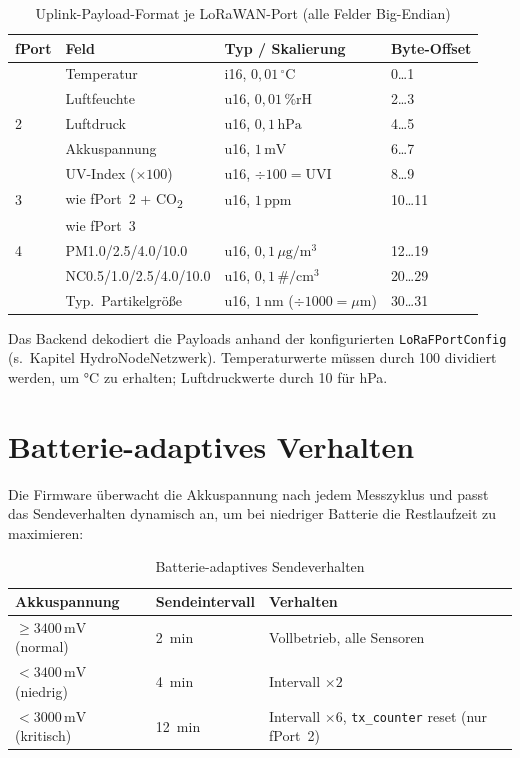 \begin{table}[H]
  \centering
  \begin{tabular}{llll}
    \hline
    \textbf{fPort} & \textbf{Feld} & \textbf{Typ / Skalierung} & \textbf{Byte-Offset} \\
    \hline
    \multirow{5}{*}{2}
      & Temperatur        & i16, $0{,}01\,{^\circ}$C & 0\dots1 \\
      & Luftfeuchte       & u16, $0{,}01\,\%\text{rH}$ & 2\dots3 \\
      & Luftdruck         & u16, $0{,}1\,\text{hPa}$    & 4\dots5 \\
      & Akkuspannung      & u16, $1\,\text{mV}$           & 6\dots7 \\
      & UV-Index ($\times 100$)   & u16, $\div 100 = \text{UVI}$     & 8\dots9 \\
    \hline
    3 & wie fPort~2 + CO\textsubscript{2} & u16, $1\,\text{ppm}$ & 10\dots11 \\
    \hline
    \multirow{3}{*}{4}
      & wie fPort~3       & &  \\
      & PM1.0/2.5/4.0/10.0 & u16, $0{,}1\,\mu\text{g}/\text{m}^3$ & 12\dots19 \\
      & NC0.5/1.0/2.5/4.0/10.0 & u16, $0{,}1\,\#/\text{cm}^3$ & 20\dots29 \\
      & Typ.\ Partikelgröße & u16, $1\,\text{nm}$ ($\div 1000 = \mu\text{m}$) & 30\dots31 \\
    \hline
  \end{tabular}
  \caption{Uplink-Payload-Format je LoRaWAN-Port (alle Felder Big-Endian)}
  \label{tab:payload}
\end{table}

Das Backend dekodiert die Payloads anhand der konfigurierten \texttt{LoRaFPortConfig} (s.\ Kapitel HydroNodeNetzwerk). Temperaturwerte müssen durch 100 dividiert werden, um °C zu erhalten; Luftdruckwerte durch 10 für hPa.

\newpage

\section*{Batterie-adaptives Verhalten}

Die Firmware überwacht die Akkuspannung nach jedem Messzyklus und passt das Sendeverhalten dynamisch an, um bei niedriger Batterie die Restlaufzeit zu maximieren:

\begin{table}[H]
  \centering
  \begin{tabular}{lll}
    \hline
    \textbf{Akkuspannung} & \textbf{Sendeintervall} & \textbf{Verhalten} \\
    \hline
    $\geq 3400\,\text{mV}$ (normal) & 2~min & Vollbetrieb, alle Sensoren \\
    $< 3400\,\text{mV}$ (niedrig)  & 4~min & Intervall $\times 2$ \\
    $< 3000\,\text{mV}$ (kritisch) & 12~min & Intervall $\times 6$, \texttt{tx\_counter} reset (nur fPort~2) \\
    \hline
  \end{tabular}
  \caption{Batterie-adaptives Sendeverhalten}
  \label{tab:battery}
\end{table}

